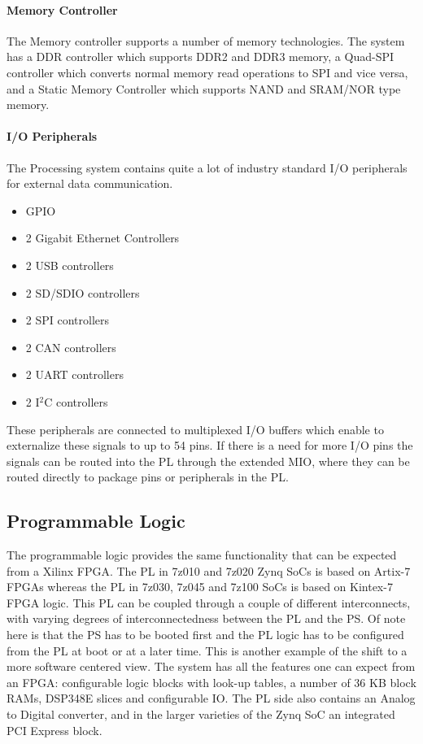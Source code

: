		\paragraph{Memory Controller}
		The Memory controller supports a number of memory technologies. The system has a DDR controller which supports DDR2 and DDR3 memory, a Quad-SPI controller which converts normal memory read operations to SPI and vice versa, and a Static Memory Controller which supports NAND and SRAM/NOR type memory.

		\paragraph{I/O Peripherals}
		The Processing system contains quite a lot of industry standard I/O peripherals for external data communication.
			\begin{multicols}{2}
				\begin{itemize}
					\item GPIO
					\item 2 Gigabit Ethernet Controllers
					\item 2 USB controllers
					\item 2 SD/SDIO controllers
					\item 2 SPI controllers
					\item 2 CAN controllers
					\item 2 UART controllers
					\item 2 I$^{2}$C controllers
				\end{itemize}
			\end{multicols}

		These peripherals are connected to multiplexed I/O buffers which enable to externalize these signals to up to 54 pins. If there is a need for more I/O pins the signals can be routed into the PL through the extended MIO, where they can be routed directly to package pins or peripherals in the PL.

	\subsection{Programmable Logic}
	The programmable logic provides the same functionality that can be expected from a Xilinx FPGA. The PL in 7z010 and 7z020 Zynq SoCs is based on Artix-7 FPGAs whereas the PL in 7z030, 7z045 and 7z100 SoCs is based on Kintex-7 FPGA logic. This PL can be coupled through a couple of different interconnects, with varying degrees of interconnectedness between the PL and the PS. Of note here is that the PS has to be booted first and the PL logic has to be configured from the PL at boot or at a later time. This is another example of the shift to a more software centered view. The system has all the features one can expect from an FPGA: configurable logic blocks with look-up tables, a number of 36 KB block RAMs, DSP348E slices and configurable IO. The PL side also contains an Analog to Digital converter, and in the larger varieties of the Zynq SoC an integrated PCI Express block.



